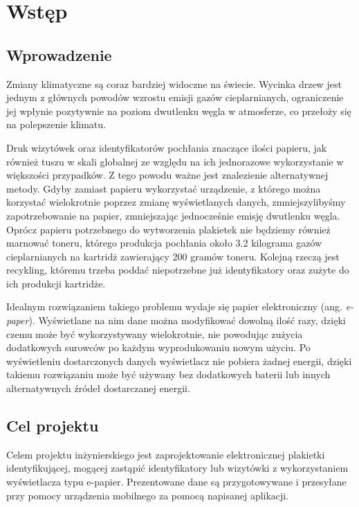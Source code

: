 \documentclass[a4paper,12pt, twoside]{article}
\begin{document}
    	\section{Wstęp}
    	
    	\subsection{Wprowadzenie}
    	Zmiany klimatyczne są coraz bardziej widoczne na świecie. Wycinka drzew jest jednym z głównych powodów wzrostu emisji gazów cieplarnianych\cite{clima_causes}, ograniczenie jej wpłynie pozytywnie na poziom dwutlenku węgla w atmosferze, co przełoży się na polepszenie klimatu. 
    	
    	Druk wizytówek oraz identyfikatorów pochłania znaczące ilości papieru, jak również tuszu w skali globalnej ze względu na ich jednorazowe wykorzystanie w większości przypadków. Z tego powodu ważne jest znalezienie alternatywnej metody. Gdyby zamiast papieru wykorzystać urządzenie, z którego można korzystać wielokrotnie poprzez zmianę wyświetlanych danych, zmniejszylibyśmy zapotrzebowanie na papier, zmniejszając jednocześnie emisję dwutlenku węgla. Oprócz papieru potrzebnego do wytworzenia plakietek nie będziemy również marnować toneru, którego produkcja pochłania około 3.2 kilograma gazów cieplarnianych\cite{cartidge_production} na kartridż zawierający 200 gramów toneru. Kolejną rzeczą jest recykling, któremu trzeba poddać niepotrzebne już identyfikatory oraz zużyte do ich produkcji kartridże.
    	
    	Idealnym rozwiązaniem takiego problemu wydaje się papier elektroniczny (ang. \textit{e-paper}). Wyświetlane na nim dane można modyfikować dowolną ilość razy, dzięki czemu może być wykorzystywany wielokrotnie, nie powodując zużycia dodatkowych surowców po każdym wyprodukowaniu nowym użyciu. Po wyświetleniu dostarczonych danych wyświetlacz nie pobiera żadnej energii, dzięki takiemu rozwiązaniu może być używany bez dodatkowych baterii lub innych alternatywnych źródeł dostarczanej energii.
    	
    	
    	
    	\subsection{Cel projektu}
    	Celem projektu inżynierskiego jest zaprojektowanie elektronicznej plakietki identyfikującej, mogącej zastąpić identyfikatory lub wizytówki z wykorzystaniem wyświetlacza typu e-papier. Prezentowane dane są przygotowywane i przesyłane przy pomocy urządzenia mobilnego za pomocą napisanej aplikacji.
    
\end{document}
